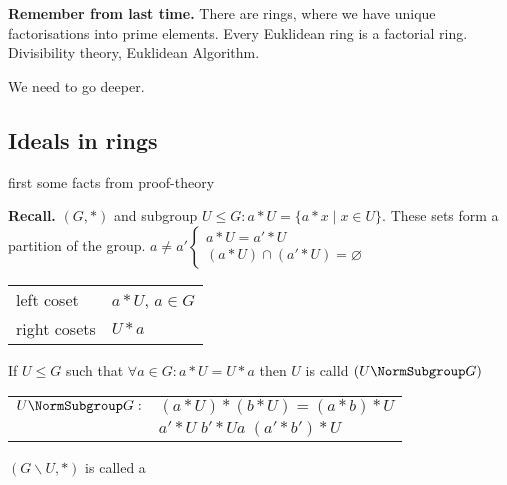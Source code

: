 

\textbf{Remember from last time.}
There are rings, where we have unique factorisations into prime elements. 
Every Euklidean ring is a factorial ring. Divisibility theory, Euklidean Algorithm.

We need to go deeper.

\subsection{Ideals in rings}

first some facts from proof-theory

\textbf{Recall.}
$(G,*)$ and subgroup $U \leq G: a * U = \{ a * x \mid x \in U \}$. These sets form a partition of the group.
$ a \neq a' \begin{cases} a*U = a'*U \\ (a*U) \cap (a'*U) = \varnothing \end{cases}$

\begin{tabular}{ll}
  left coset  & $a*U$, $a \in G$\\
  right cosets & $U*a$
\end{tabular}


If $U \leq G$ such that $\forall a \in G: a*U = U*a$ then $U$ is calld  $(U \NormSubgroup G)$

\begin{tabular}{ll}
$U \NormSubgroup G :$ & $(a*U) * (b*U) = (a*b) * U$ \\
                      & $ a' *U \; b'*U a \; (a'*b')*U$
\end{tabular}

$(G \backslash U, *)$ is called a 

